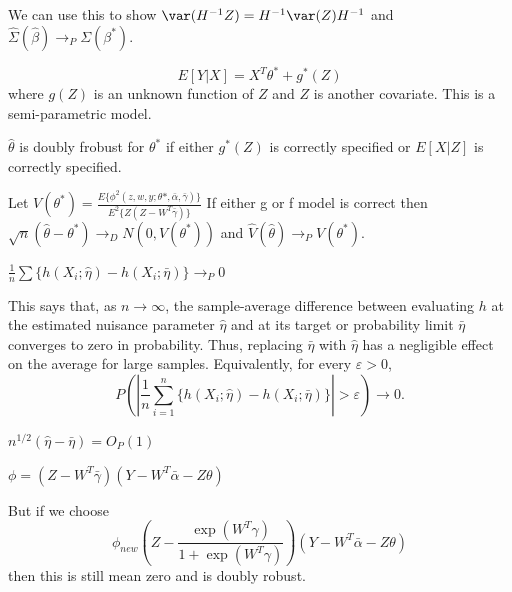 \documentclass[answers,12pt,addpoints]{exam}
\begin{document}
\begin{remark}
    We can use this to show $\var(H^{-1} Z) = H^{-1} \var(Z) H^{-1}$ and $\hat{\Sigma}(\hat{\beta}) \to_P \Sigma(\beta^*)$.
\end{remark}

\begin{definition}
    $$E[Y|X] = X^T \theta^* + g^*(Z)$$
    where $g(Z)$ is an unknown function of $Z$ and $Z$ is another covariate. This is a semi-parametric model.
\end{definition}

\begin{proposition}
    [1.9]
    $\hat \theta$ is doubly frobust for $\theta^*$ if either $g^*(Z)$ is correctly specified or $E[X|Z]$ is correctly specified.
\end{proposition}

\begin{proposition}
    Let $V(\theta^*) = \frac{E\{\phi^2(z,w,y;\theta*, \bar \alpha, \bar \gamma) \}}{E^2\{Z (Z-W^T\bar \gamma)\}}$
    If either g or f model is correct then $\sqrt{n}(\hat \theta - \theta^*) \to_D N(0, V(\theta^*))$ and $\hat V(\hat \theta) \to_P V(\theta^*)$.
\end{proposition}

\begin{remark}
    

    $\frac{1}{n}\sum \{ h(X_i ; \hat \eta) - h(X_i ; \bar \eta)\} \to_P 0$

    This says that, as $n \to \infty$, the sample-average difference between
    evaluating $h$ at the estimated nuisance parameter $\hat\eta$ and at its
    target or probability limit $\bar\eta$ converges to zero in probability.
    Thus, replacing $\bar\eta$ with $\hat\eta$ has a negligible effect on the
    average for large samples. Equivalently, for every $\varepsilon>0$,
    $$
    P\left(\left|\frac{1}{n}\sum_{i=1}^n
    \{h(X_i;\hat\eta)-h(X_i;\bar\eta)\}\right|>\varepsilon\right)\to 0.
    $$
    
    $n^{1/2} (\hat \eta - \bar \eta) = O_P(1)$
    
\end{remark}

\begin{definition}
    $\phi = (Z - W^T \bar \gamma) (Y - W^T \bar \alpha - Z\theta)$

    But if we choose 
    $$\phi_{new} (Z - \frac{\exp(W^T \gamma)}{1+\exp(W^T \gamma)})(Y - W^T \bar \alpha - Z\theta)$$
    then this is still mean zero and is doubly robust.
\end{definition}
\end{document}
